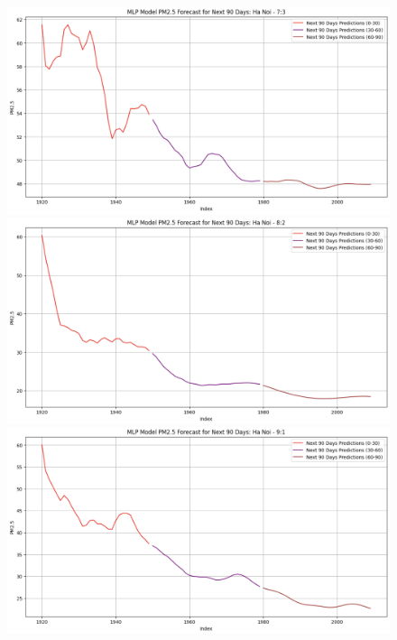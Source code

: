 \begin{figure}[H]
    \begin{minipage}{0.15\textwidth}
        \centering
        \includegraphics[width=1\textwidth]{img/final/MLP/90D/MLP_7_3_HN_90D.png}
        \end{minipage}
        \hfill
        \begin{minipage}{0.15\textwidth}
        \centering
        \includegraphics[width=1\textwidth]{img/final/MLP/90D/MLP_8_2_HN_90D.png}
        \end{minipage}
        \hfill
        \begin{minipage}{0.15\textwidth}
        \centering
        \includegraphics[width=1\textwidth]{img/final/MLP/90D/MLP_9_1_HN_90D.png}
        \end{minipage}
        \hfill


\end{figure}
